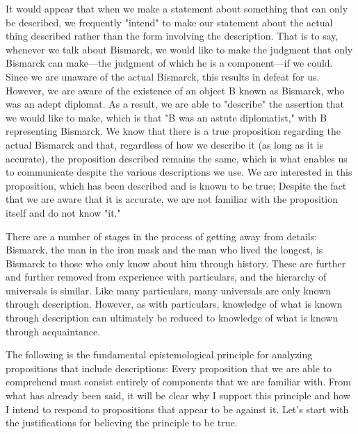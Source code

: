 \documentclass[a4paper,12pt]{book}[2004/02/16]
\theoremstyle{ilemma}
\theoremstyle{itheorem}
\theoremstyle{iother}
\theoremstyle{icorollary}
\theoremstyle{numcorollary}
\theoremstyle{idefinition}
\begin{document}
It would appear that when we make a statement about something that can only be described, we frequently "intend" to make our statement about the actual thing described rather than the form involving the description. That is to say, whenever we talk about Bismarck, we would like to make the judgment that only Bismarck can make—the judgment of which he is a component—if we could.
Since we are unaware of the actual Bismarck, this results in defeat for us. However, we are aware of the existence of an object B known as Bismarck, who was an adept diplomat. As a result, we are able to "describe" the assertion that we would like to make, which is that "B was an astute diplomatist," with B representing Bismarck. We know that there is a true proposition regarding the actual Bismarck and that, regardless of how we describe it (as long as it is accurate), the proposition described remains the same, which is what enables us to communicate despite the various descriptions we use. We are interested in this proposition, which has been described and is known to be true; Despite the fact that we are aware that it is accurate, we are not familiar with the proposition itself and do not know "it."

There are a number of stages in the process of getting away from details: Bismarck, the man in the iron mask and the man who lived the longest, is Bismarck to those who only know about him through history. These are further and further removed from experience with particulars, and the hierarchy of universals is similar. Like many particulars, many universals are only known through description. However, as with particulars, knowledge of what is known through description can ultimately be reduced to knowledge of what is known through acquaintance.

The following is the fundamental epistemological principle for analyzing propositions that include descriptions: Every proposition that we are able to comprehend must consist entirely of components that we are familiar with. From what has already been said, it will be clear why I support this principle and how I intend to respond to propositions that appear to be against it. Let's start with the justifications for believing the principle to be true.
\end{document}
